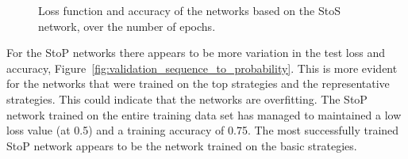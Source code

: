 \begin{figure}[!htbp]
\begin{subfigure}{\textwidth}
    \end{subfigure}
    \caption{Loss function and accuracy of the networks based on the StoS network,
    over the number of epochs.}\label{fig:validation_sequence_to_sequence}
\end{figure}

For the StoP networks there appears to be more variation in the test loss and
accuracy, Figure~\ref{fig:validation_sequence_to_probability}. This is more evident
for the networks that were trained on the top strategies and the representative
strategies. This could indicate that the networks are overfitting. The StoP
network trained on the entire training data set has managed to maintained
a low loss value (at 0.5) and a training accuracy of 0.75. The most successfully
trained StoP network appears to be the network trained on the basic strategies.

